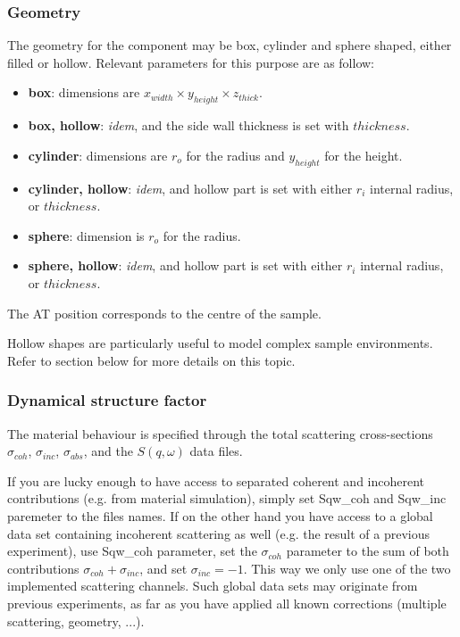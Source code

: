 \subsubsection{Geometry}

The geometry for the component may be box, cylinder and sphere shaped, either filled or hollow. Relevant parameters for this purpose are as follow:
\begin{itemize}
\item {\bf box}: dimensions are $x_{width} \times y_{height} \times z_{thick}$.
\item {\bf box, hollow}: \emph{idem}, and the side wall thickness is set with $thickness$.
\item {\bf cylinder}: dimensions are $r_o$ for the radius and $y_{height}$ for the height.
\item {\bf cylinder, hollow}: \emph{idem}, and hollow part is set with either $r_i$ internal radius, or $thickness$.
\item {\bf sphere}: dimension is $r_o$ for the radius.
\item {\bf sphere, hollow}: \emph{idem}, and hollow part is set with either $r_i$ internal radius, or $thickness$.
\end{itemize}
The AT position corresponds to the centre of the sample.

Hollow shapes are particularly useful to model complex sample environments. Refer to section below for more details on this topic.

\subsubsection{Dynamical structure factor}

The material behaviour is specified through the total scattering cross-sections $\sigma_{coh}$, $\sigma_{inc}$, $\sigma_{abs}$, and the $S(q, \omega)$ data files.

If you are lucky enough to have access to separated coherent and incoherent contributions (e.g. from material simulation), simply set Sqw\_coh and Sqw\_inc paremeter to the files names. If on the other hand you have access to a global data set containing incoherent scattering as well (e.g. the result of a previous experiment), use Sqw\_coh parameter, set the $\sigma_{coh}$ parameter to the sum of both contributions $\sigma_{coh}+\sigma_{inc}$, and set $\sigma_{inc}=-1$. This way we only use one of the two implemented  scattering channels. Such global data sets may originate from previous experiments, as far as you have applied all known corrections (multiple scattering, geometry, ...).

